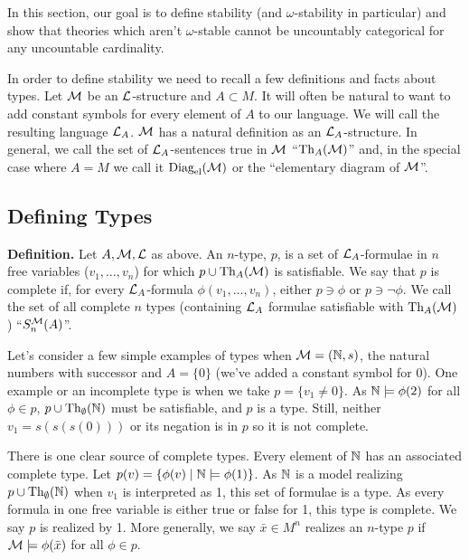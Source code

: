 In this section, our goal is to define stability (and \(\omega\)-stability in particular) and show that theories which aren't \(\omega\)-stable cannot be uncountably categorical for any uncountable cardinality. 

In order to define stability we need to recall a few definitions and facts about types. 
Let \(\mathcal{M}\) be an \(\mathcal{L}\)-structure and \(A \subset M\). 
It will often be natural to want to add constant symbols for every element of \(A\) to our language. 
We will call the resulting language \(\mathcal{L}_A\). \(\mathcal{M}\) has a natural definition as an \(\mathcal{L}_A\)-structure. 
In general, we call the set of \(\mathcal{L}_A\)-sentences true in \(\mathcal{M}\) ``\(\text{Th}_A(\mathcal{M})\)'' and, in the special case where \(A = M\) we call it \(\text{Diag}_\text{el}(\mathcal{M})\) or the ``elementary diagram of \(\mathcal{M}\)''. 

\subsection{Defining Types}

\textbf{Definition.} Let \(A, \mathcal{M}, \mathcal{L}\) as above. 
An \(n\)-type, \(p\), is a set of \(\mathcal{L}_A\)-formulae in \(n\) free variables (\(v_1, \ldots, v_n\)) for which \(p \cup \text{Th}_A(\mathcal{M})\) is satisfiable.
We say that \(p\) is complete if, for every \(\mathcal{L}_A\)-formula \(\phi(v_1, \ldots, v_n)\), either \(p \ni \phi\) or \(p \ni \neg \phi\). 
We call the set of all complete \(n\) types (containing \(\mathcal{L}_A\) formulae satisfiable with \(\text{Th}_A(\mathcal{M})\)) ``\(S_n^{\mathcal{M}}(A)\)''. 

Let's consider a few simple examples of types when  \(\mathcal{M} = (\mathbb{N},s)\), the natural numbers with successor and \(A = \{0\}\) (we've added a constant symbol for 0). 
One example or an incomplete type is when we take \(p = \{v_1 \neq 0\}\). 
As \(\mathbb{N} \models \phi(2)\) for all \(\phi \in p\), \(p \cup \text{Th}_\emptyset(\mathbb{N})\) must be satisfiable, and \(p\) is a type. 
Still, neither \(v_1 = s(s(s(0)))\) or its negation is in \(p\) so it is not complete. 

There is one clear source of complete types. 
Every element of \(\mathbb{N}\) has an associated complete type. 
Let \(p(v) = \{\phi(v) \mid \mathbb{N} \models \phi(1)\}\). 
As \(\mathbb{N}\) is a model realizing \(p \cup \text{Th}_\emptyset(\mathbb{N})\) when \(v_1\) is interpreted as 1, this set of formulae is a type. 
As every formula in one free variable is either true or false for 1, this type is complete. 
We say \(p\) is realized by 1. 
More generally, we say \(\bar{x} \in M^n\) realizes an \(n\)-type \(p\) if \(\mathcal{M} \models \phi(\bar{x})\) for all \(\phi \in p\).  

